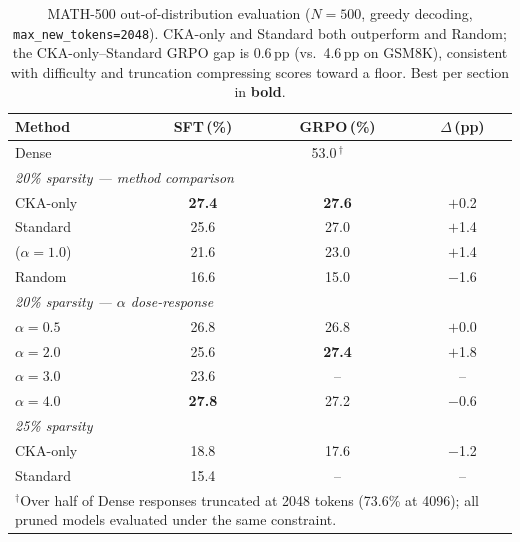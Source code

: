 \begin{table}[h]
\centering
\small
\caption{MATH-500 out-of-distribution evaluation ($N{=}500$, greedy decoding, \texttt{max\_new\_tokens=2048}). CKA-only and Standard both outperform \rasp{} and Random; the CKA-only--Standard GRPO gap is 0.6\,pp (vs.\ 4.6\,pp on GSM8K), consistent with difficulty and truncation compressing scores toward a floor. Best per section in \textbf{bold}.}
\label{tab:math500}
\begin{tabular}{@{}lccc@{}}
\toprule
Method & SFT\,(\%) & GRPO\,(\%) & $\Delta$\,(pp) \\
\midrule
Dense & \multicolumn{3}{c}{53.0\,$^\dagger$} \\
\midrule
\multicolumn{4}{l}{\textit{20\% sparsity --- method comparison}} \\
CKA-only & \textbf{27.4} & \textbf{27.6} & $+$0.2 \\
Standard & 25.6 & 27.0 & $+$1.4 \\
\rasp{} ($\alpha{=}1.0$) & 21.6 & 23.0 & $+$1.4 \\
Random & 16.6 & 15.0 & $-$1.6 \\
\midrule
\multicolumn{4}{l}{\textit{20\% sparsity --- $\alpha$ dose-response}} \\
$\alpha{=}0.5$ & 26.8 & 26.8 & $+$0.0 \\
$\alpha{=}2.0$ & 25.6 & \textbf{27.4} & $+$1.8 \\
$\alpha{=}3.0$ & 23.6 & -- & -- \\
$\alpha{=}4.0$ & \textbf{27.8} & 27.2 & $-$0.6 \\
\midrule
\multicolumn{4}{l}{\textit{25\% sparsity}} \\
CKA-only & 18.8 & 17.6 & $-$1.2 \\
Standard & 15.4 & -- & -- \\
\bottomrule
\multicolumn{4}{p{0.85\columnwidth}}{\footnotesize $^\dagger$Over half of Dense responses truncated at 2048 tokens (73.6\% at 4096); all pruned models evaluated under the same constraint.}
\end{tabular}
\end{table}
